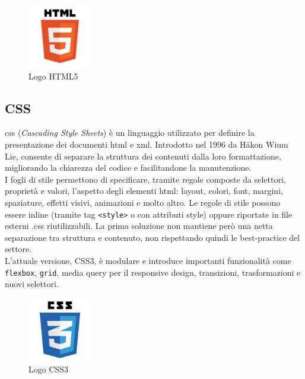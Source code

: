 \begin{figure}[H]
    \centering
    \includegraphics[width=0.25\textwidth]{img/html5.png}
    \caption[Logo HTML5]{Logo HTML5}
\end{figure}

\subsection{CSS}
\noindent \acrshort{css} (\textit{Cascading Style Sheets}) è un linguaggio utilizzato per definire la presentazione dei documenti \acrshort{html} e \acrshort{xml}. Introdotto nel 1996 da Håkon Wium Lie, consente di separare la struttura dei contenuti dalla loro formattazione, migliorando la chiarezza del codice e facilitandone la manutenzione.\\ 
I fogli di stile permettono di specificare, tramite regole composte da selettori, proprietà e valori, l’aspetto degli elementi \acrshort{html}: layout, colori, font, margini, spaziature, effetti visivi, animazioni e molto altro. Le regole di stile possono essere inline (tramite tag \texttt{<style>} o con attributi style) oppure riportate in file esterni .css riutilizzabili. La prima soluzione non mantiene però una netta separazione tra struttura e contenuto, non rispettando quindi le best-practice del settore.\\ 
L'attuale versione, CSS3, è modulare e introduce importanti funzionalità come \texttt{flexbox}, \texttt{grid}, media query per il responsive design, transizioni, trasformazioni e nuovi selettori.
\begin{figure}[H]
    \centering
    \includegraphics[width=0.25\textwidth]{img/css3.png}
    \caption[Logo CSS3]{Logo CSS3}
\end{figure}

